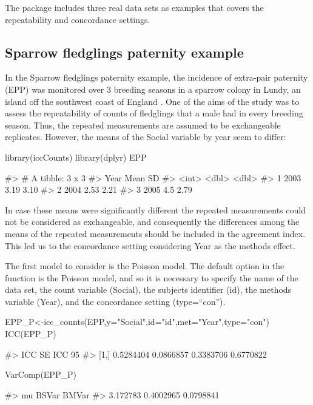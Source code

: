 The package includes three real data sets as examples that covers the
repeatability and concordance settings.

\hypertarget{sparrow-fledglings-paternity-example}{%
\subsection{Sparrow fledglings paternity
example}\label{sparrow-fledglings-paternity-example}}

In the Sparrow fledglings paternity example, the incidence of extra-pair
paternity (EPP) was monitored over 3 breeding seasons in a sparrow
colony in Lundy, an island off the southwest coast of England
\citep{Schroeder2012}. One of the aims of the study was to assess the
repeatability of counts of fledglings that a male had in every breeding
season. Thus, the repeated measurements are assumed to be exchangeable
replicates. However, the means of the Social variable by year seem to
differ:

\begin{Schunk}
\begin{Sinput}
library(iccCounts)
library(dplyr)
EPP %>% group_by(Year) %>% summarize(Mean=mean(Social),SD=sd(Social))
\end{Sinput}
\begin{Soutput}
#> # A tibble: 3 x 3
#>    Year  Mean    SD
#>   <int> <dbl> <dbl>
#> 1  2003  3.19  3.10
#> 2  2004  2.53  2.21
#> 3  2005  4.5   2.79
\end{Soutput}
\end{Schunk}

In case these means were significantly different the repeated
measurements could not be considered as exchangeable, and consequently
the differences among the means of the repeated measurements should be
included in the agreement index. This led us to the concordance setting
considering Year as the methods effect.

The first model to consider is the Poisson model. The default option in
the  function is the Poisson model, and so it is
necessary to specify the name of the data set, the count variable
(Social), the subjects identifier (id), the methods variable (Year), and
the concordance setting (type=``con'').

\begin{Schunk}
\begin{Sinput}
EPP_P<-icc_counts(EPP,y="Social",id="id",met="Year",type="con")
ICC(EPP_P)
\end{Sinput}
\begin{Soutput}
#>            ICC    SE ICC 95% CI LL 95% CI UL
#> [1,] 0.5284404 0.0866857 0.3383706 0.6770822
\end{Soutput}
\begin{Sinput}
VarComp(EPP_P)
\end{Sinput}
\begin{Soutput}
#>        mu     BSVar     BMVar
#>  3.172783 0.4002965 0.0798841
\end{Soutput}
\end{Schunk}

